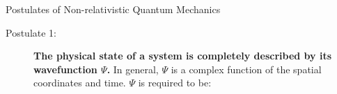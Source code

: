 \message{ !name(Outline.tex)}\documentclass[11pt]{article}
\begin{document}
\begin{outline}
\begin{table} 
\begin{center}
    \caption{\large{Postulates of Non-relativistic Quantum Mechanics}}
   \begin{description}
    \item[Postulate 1:] {{\bf The physical state of a system is completely described by
        its wavefunction $\Psi$.}  In general, $\Psi$ is a complex function of the spatial
      coordinates and time.  $\Psi$ is required to be:}


\end{description}
\end{center}
\end{table}
\end{outline}
\end{document}
